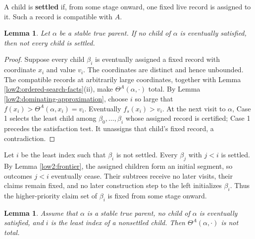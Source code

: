 \documentclass[10pt,a4paper]{amsart}
\newtheorem{lemma}[theorem]{Lemma}
\begin{document}
A child is \textbf{settled} if, from some stage onward, one fixed live record
is assigned to it. Such a record is compatible with $A$.

\begin{lemma}\label{low2:not-all-settle}
Let $\alpha$ be a stable true parent. If no child of $\alpha$ is eventually
satisfied, then not every child is settled.
\end{lemma}

\begin{proof}
Suppose every child $\beta_i$ is eventually assigned a fixed record with
coordinate $x_i$ and value $v_i$.
The coordinates are distinct and hence unbounded. The compatible records at
arbitrarily large coordinates, together with Lemma
\ref{low2:ordered-search-facts}(ii), make
$\Theta^A(\alpha,\cdot)$ total. By Lemma
\ref{low2:dominating-approximation}, choose $i$ so large that $f(x_i)>\Theta^A(\alpha,x_i)=v_i$.
Eventually $f_s(x_i)>v_i$. At the next visit to $\alpha$, Case 1 selects the
least child among $\beta_0,\ldots,\beta_i$ whose assigned record is certified;
Case 1 precedes the satisfaction test. It unassigns that child's fixed record,
a contradiction.
\end{proof}

Let $i$ be the least index such that $\beta_i$ is not settled. Every
$\beta_j$ with $j<i$ is settled. By Lemma \ref{low2:frontier}, the assigned
children form an initial segment, so outcomes $j<i$ eventually cease. Their
subtrees receive no later
visits, their claims remain fixed, and no later construction step to the left
initializes $\beta_i$. Thus the higher-priority claim set of $\beta_i$ is
fixed from some stage onward.

\begin{lemma}\label{low2:auxiliary-partial}
Assume that $\alpha$ is a stable true parent, no child of $\alpha$ is
eventually satisfied, and $i$ is the least index of a nonsettled child. Then
$\Theta^A(\alpha,\cdot)$ is not total.
\end{lemma}
\end{document}
